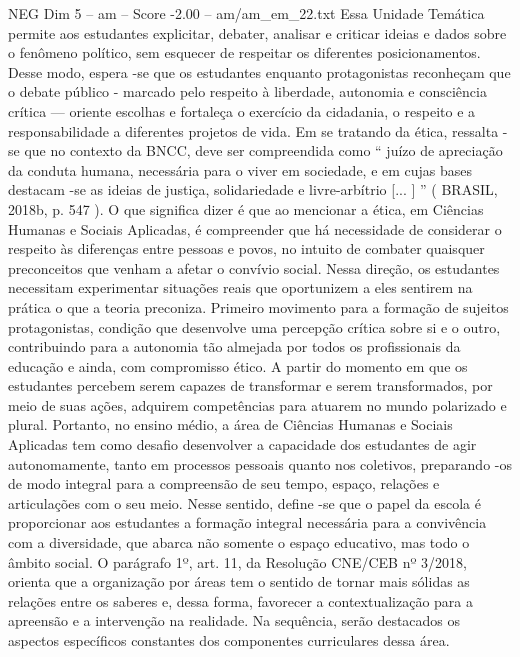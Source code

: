 \begin{textsample}{NEG Dim 5 – am – Score -2.00 – am/am\_em\_22.txt}
Essa Unidade Temática permite aos estudantes explicitar, debater, analisar e criticar ideias e dados sobre o fenômeno político, sem esquecer de respeitar os diferentes posicionamentos.
Desse modo, espera -se que os estudantes enquanto protagonistas reconheçam que o debate público - marcado pelo respeito à liberdade, autonomia e consciência crítica — oriente escolhas e fortaleça o exercício da cidadania, o respeito e a responsabilidade a diferentes projetos de vida.
Em se tratando da ética, ressalta -se que no contexto da BNCC, deve ser compreendida como “ juízo de apreciação da conduta humana, necessária para o viver em sociedade, e em cujas bases destacam -se as ideias de justiça, solidariedade e livre-arbítrio [... ] ” ( BRASIL, 2018b, p. 547 ).
O que significa dizer é que ao mencionar a ética, em Ciências Humanas e Sociais Aplicadas, é compreender que há necessidade de considerar o respeito às diferenças entre pessoas e povos, no intuito de combater quaisquer preconceitos que venham a afetar o convívio social.
Nessa direção, os estudantes necessitam experimentar situações reais que oportunizem a eles sentirem na prática o que a teoria preconiza.
Primeiro movimento para a formação de sujeitos protagonistas, condição que desenvolve uma percepção crítica sobre si e o outro, contribuindo para a autonomia tão almejada por todos os profissionais da educação e ainda, com compromisso ético.
A partir do momento em que os estudantes percebem serem capazes de transformar e serem transformados, por meio de suas ações, adquirem competências para atuarem no mundo polarizado e plural.
Portanto, no ensino médio, a área de Ciências Humanas e Sociais Aplicadas tem como desafio desenvolver a capacidade dos estudantes de agir autonomamente, tanto em processos pessoais quanto nos coletivos, preparando -os de modo integral para a compreensão de seu tempo, espaço, relações e articulações com o seu meio.
Nesse sentido, define -se que o papel da escola é proporcionar aos estudantes a formação integral necessária para a convivência com a diversidade, que abarca não somente o espaço educativo, mas todo o âmbito social.
O parágrafo 1º, art. 11, da Resolução CNE/CEB nº 3/2018, orienta que a organização por áreas tem o sentido de tornar mais sólidas as relações entre os saberes e, dessa forma, favorecer a contextualização para a apreensão e a intervenção na realidade.
Na sequência, serão destacados os aspectos específicos constantes dos componentes curriculares dessa área.

\end{textsample}
